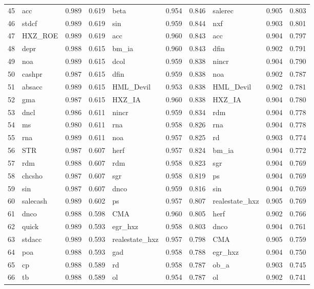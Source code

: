 \documentclass[12pt]{article}
\begin{document}
\begin{landscape}
\begin{footnotesize}
\begin{longtable}{l|lcc|lcc|lcc}
  45 & acc & 0.989 & 0.619 & beta & 0.954 & 0.846 & salerec & 0.905 & 0.803 \\ 
  46 & stdcf & 0.989 & 0.619 & sin & 0.959 & 0.844 & nxf & 0.903 & 0.801 \\ 
  47 & HXZ\_ROE & 0.989 & 0.619 & acc & 0.960 & 0.843 & acc & 0.904 & 0.797 \\ 
  48 & depr & 0.988 & 0.615 & bm\_ia & 0.960 & 0.843 & dfin & 0.902 & 0.791 \\ 
  49 & noa & 0.989 & 0.615 & dcol & 0.959 & 0.838 & nincr & 0.904 & 0.790 \\ 
  50 & cashpr & 0.987 & 0.615 & dfin & 0.959 & 0.838 & noa & 0.902 & 0.787 \\ 
  51 & absacc & 0.989 & 0.615 & HML\_Devil & 0.953 & 0.838 & HML\_Devil & 0.902 & 0.781 \\ 
  52 & gma & 0.987 & 0.615 & HXZ\_IA & 0.960 & 0.838 & HXZ\_IA & 0.904 & 0.780 \\ 
  53 & dncl & 0.986 & 0.611 & nincr & 0.959 & 0.834 & rdm & 0.904 & 0.778 \\ 
  54 & ms & 0.980 & 0.611 & rna & 0.958 & 0.826 & rna & 0.904 & 0.778 \\ 
  55 & rna & 0.989 & 0.611 & noa & 0.957 & 0.825 & rd & 0.903 & 0.774 \\ 
  56 & STR & 0.987 & 0.607 & herf & 0.957 & 0.824 & bm\_ia & 0.904 & 0.772 \\ 
  57 & rdm & 0.988 & 0.607 & rdm & 0.958 & 0.823 & sgr & 0.904 & 0.769 \\ 
  58 & chcsho & 0.987 & 0.607 & sgr & 0.958 & 0.819 & ps & 0.904 & 0.769 \\ 
  59 & sin & 0.987 & 0.607 & dnco & 0.959 & 0.816 & sin & 0.904 & 0.769 \\ 
  60 & salecash & 0.989 & 0.602 & ps & 0.957 & 0.807 & realestate\_hxz & 0.905 & 0.769 \\ 
  61 & dnco & 0.988 & 0.598 & CMA & 0.960 & 0.805 & herf & 0.902 & 0.766 \\ 
  62 & quick & 0.989 & 0.593 & egr\_hxz & 0.958 & 0.803 & dnco & 0.904 & 0.761 \\ 
  63 & stdacc & 0.989 & 0.593 & realestate\_hxz & 0.957 & 0.798 & CMA & 0.905 & 0.759 \\ 
  64 & poa & 0.988 & 0.593 & gad & 0.958 & 0.788 & egr\_hxz & 0.904 & 0.750 \\ 
  65 & cp & 0.988 & 0.589 & rd & 0.958 & 0.787 & ob\_a & 0.903 & 0.745 \\ 
  66 & tb & 0.988 & 0.589 & ol & 0.954 & 0.787 & ol & 0.902 & 0.741 \\ 

\end{longtable}
\end{footnotesize}
\end{landscape}
\end{document}
